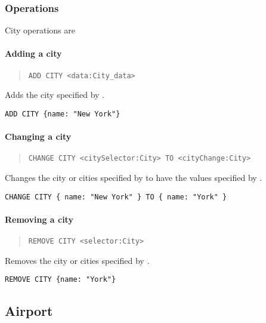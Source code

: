 \subsubsection{Operations}
City operations are
\paragraph{Adding a city}
\begin{quote}
  \lstinline{ADD CITY <data:City_data>}
\end{quote}
Adds the city specified by .

\begin{texa}
  \lstinline|ADD CITY {name: "New York"}|
\end{texa}

\paragraph{Changing a city}
  \begin{quote}
    \lstinline|CHANGE CITY <citySelector:City> TO <cityChange:City>|
  \end{quote}
Changes the city or cities specified by  to have the values
specified by .

\begin{texa}
  \lstinline|CHANGE CITY { name: "New York" } TO { name: "York" }|
\end{texa}

\paragraph{Removing a city}
\begin{quote}
  \lstinline{REMOVE CITY <selector:City>}
\end{quote}
Removes the city or cities specified by .

\begin{texa}
  \lstinline|REMOVE CITY {name: "York"}|
\end{texa}


\subsection{Airport}
